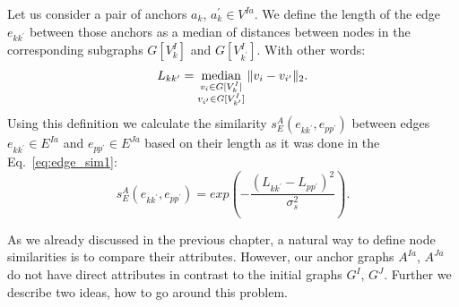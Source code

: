 Let us consider a pair of anchors  $a_k$, $a_k^\prime\in V^{Ia}$. We define the length of the edge $e_{kk^{\prime}}$ between those anchors as a median of distances between nodes in the corresponding subgraphs $G[V^I_k]$ and $G[V^I_{k^\prime}]$. With other words:
\begin{equation} L_{kk^\prime} = \mathop{\rm median}_{\substack{v_i\in G[V^I_k]\\ v_{i^\prime}\in G[V^I_{k^\prime}]} }\|v_i-v_{i^\prime}\|_{2}. \end{equation}
Using this definition we calculate the similarity $s^A_E(e_{kk^\prime}, e_{pp^\prime})$ between edges $e_{kk^\prime}\in E^{Ia}$ and $e_{pp^\prime}\in E^{Ja}$ based on their length as it was done in the Eq.~\eqref{eq:edge_sim1}:
\begin{equation*}
s^A_E(e_{kk^\prime}, e_{pp^\prime}) = exp(-\frac{(L_{kk^\prime} - L_{pp^\prime})^2}{\sigma^2_{s}}).
\label{eq:s_e_A}
\end{equation*}

As we already discussed in the previous chapter, a natural way to define node similarities is to compare their attributes. However, our anchor graphs $A^{Ia}$, $A^{Ja}$ do not have direct attributes in contrast to the initial graphs $G^I$, $G^J$. Further we describe two ideas, how to go around this problem. %

